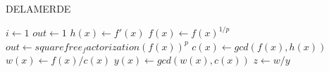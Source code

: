 \begin{algorithm}
  \caption{DELAMERDE    }
  \begin{algorithmic}[1]
    \Statex
      \State $i\gets 1$
      \State $out\gets 1$
      \State $h(x)\gets f'(x)$
        \State $f(x)\gets f(x)^{1/p}$
        \State $out\gets squarefree_factorization(f(x))^p$
      \Else
        \State $c(x)\gets gcd(f(x), h(x))$
        \State $w(x)\gets f(x)/c(x)$
          \State $y(x)\gets gcd(w(x), c(x))$
          \State $z\gets w/y$
        \EndWhile
      \EndIf
      \State {}
    \EndFunction
  \end{algorithmic}
\end{algorithm}
